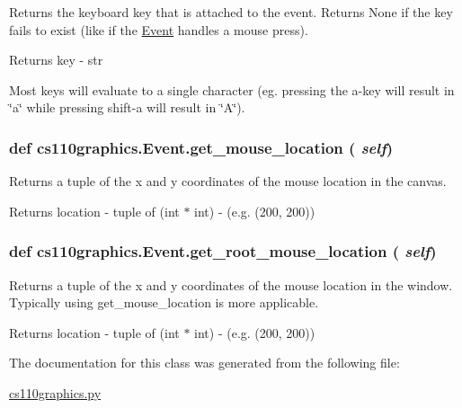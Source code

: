 Returns the keyboard key that is attached to the event. Returns None if the key fails to exist (like if the \hyperlink{classcs110graphics_1_1Event}{Event} handles a mouse press). \begin{DoxyReturn}{Returns}
key -\/ str
\end{DoxyReturn}
Most keys will evaluate to a single character (eg. pressing the a-\/key will result in \char`\"{}a\char`\"{} while pressing shift-\/a will result in \char`\"{}A\char`\"{}). \hypertarget{classcs110graphics_1_1Event_a2db4866adee7a6ddb8d32240801fb8ce}{
\subsubsection[{get\_\-mouse\_\-location}]{\setlength{\rightskip}{0pt plus 5cm}def cs110graphics.Event.get\_\-mouse\_\-location ( {\em self})}}
\label{classcs110graphics_1_1Event_a2db4866adee7a6ddb8d32240801fb8ce}


Returns a tuple of the x and y coordinates of the mouse location in the canvas. \begin{DoxyReturn}{Returns}
location -\/ tuple of (int $\ast$ int) -\/ (e.g. (200, 200)) 
\end{DoxyReturn}
\hypertarget{classcs110graphics_1_1Event_a7c8fb2d5e9288db125801d5a6e66ecf1}{
\subsubsection[{get\_\-root\_\-mouse\_\-location}]{\setlength{\rightskip}{0pt plus 5cm}def cs110graphics.Event.get\_\-root\_\-mouse\_\-location ( {\em self})}}
\label{classcs110graphics_1_1Event_a7c8fb2d5e9288db125801d5a6e66ecf1}


Returns a tuple of the x and y coordinates of the mouse location in the window. Typically using get\_\-mouse\_\-location is more applicable. \begin{DoxyReturn}{Returns}
location -\/ tuple of (int $\ast$ int) -\/ (e.g. (200, 200)) 
\end{DoxyReturn}


The documentation for this class was generated from the following file:\begin{DoxyCompactItemize}
\item 
\hyperlink{cs110graphics_8py}{cs110graphics.py}\end{DoxyCompactItemize}

